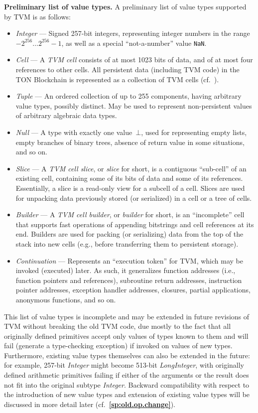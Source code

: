 \documentclass[12pt,oneside]{article}
\def\makepoint#1{\medbreak\noindent{\bf #1.\ }}
\def\nxsubpoint{\refstepcounter{subsubsection}%
  \smallbreak\makepoint{\thesubsubsection}}
\def\refpoint#1{{\rm\textbf{\ref{#1}}}}
\let\ptref=\refpoint
\def\emb#1{\textbf{#1.}}
\begin{document}
\nxsubpoint\label{sp:val.types}\emb{Preliminary list of value types}
A preliminary list of value types supported by TVM is as follows:
\begin{itemize}
\item {\em Integer\/} --- Signed 257-bit integers, representing integer numbers in the range $-2^{256}\ldots2^{256}-1$, as well as a special ``not-a-number'' value \texttt{NaN}.
\item {\em Cell\/} --- A {\em TVM cell\/} consists of at most 1023 bits of data, and of at most four references to other cells. All persistent data (including TVM code) in the TON Blockchain is represented as a collection of TVM cells (cf.~\cite[2.5.14]{TON}).
\item {\em Tuple\/} --- An ordered collection of up to 255 components, having arbitrary value types, possibly distinct. May be used to represent non-persistent values of arbitrary algebraic data types.
\item {\em Null\/} --- A type with exactly one value~$\bot$, used for representing empty lists, empty branches of binary trees, absence of return value in some situations, and so on.
\item {\em Slice\/} --- A {\em TVM cell slice}, or {\em slice\/} for short, is a contiguous ``sub-cell'' of an existing cell, containing some of its bits of data and some of its references. Essentially, a slice is a read-only view for a subcell of a cell. Slices are used for unpacking data previously stored (or serialized) in a cell or a tree of cells.
\item {\em Builder\/} --- A {\em TVM cell builder}, or {\em builder\/} for short, is an ``incomplete'' cell that supports fast operations of appending bitstrings and cell references at its end. Builders are used for packing (or serializing) data from the top of the stack into new cells (e.g., before transferring them to persistent storage).
\item {\em Continuation\/} --- Represents an ``execution token'' for TVM, which may be invoked (executed) later. As such, it generalizes function addresses (i.e., function pointers and references), subroutine return addresses, instruction pointer addresses, exception handler addresses, closures, partial applications, anonymous functions, and so on.
\end{itemize}
This list of value types is incomplete and may be extended in future revisions of TVM without breaking the old TVM code, due mostly to the fact that all originally defined primitives accept only values of types known to them and will fail (generate a type-checking exception) if invoked on values of new types. Furthermore, existing value types themselves can also be extended in the future: for example, 257-bit {\em Integer\/} might become 513-bit {\em LongInteger\/}, with originally defined arithmetic primitives failing if either of the arguments or the result does not fit into the original subtype {\em Integer}. Backward compatibility with respect to the introduction of new value types and extension of existing value types will be discussed in more detail later (cf.~\ptref{sp:old.op.change}).
\end{document}
